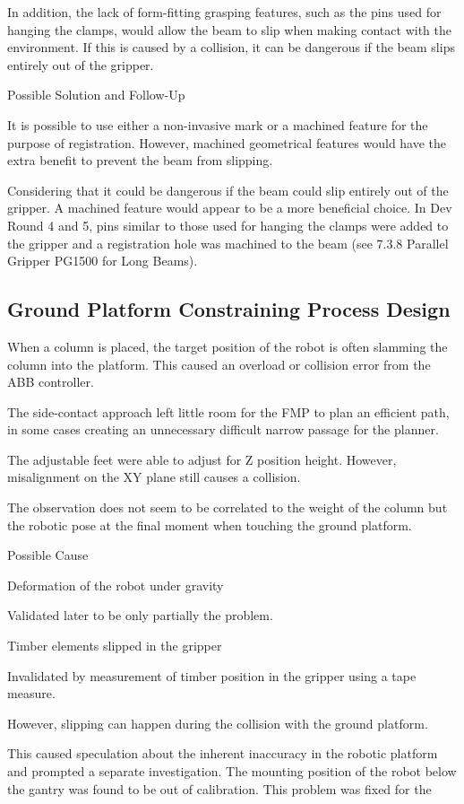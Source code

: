 \begin{itemise}
\begin{itemise}
\begin{itemise}
\begin{itemise}
In addition, the lack of form-fitting grasping features, such as the pins used for hanging the clamps, would allow the beam to slip when making contact with the environment. If this is caused by a collision, it can be dangerous if the beam slips entirely out of the gripper.

Possible Solution and Follow-Up

It is possible to use either a non-invasive mark or a machined feature for the purpose of registration. However, machined geometrical features would have the extra benefit to prevent the beam from slipping. 

Considering that it could be dangerous if the beam could slip entirely out of the gripper. A machined feature would appear to be a more beneficial choice. In Dev Round 4 and 5, pins similar to those used for hanging the clamps were added to the gripper and a registration hole was machined to the beam (see 7.3.8 Parallel Gripper PG1500 for Long Beams).

\subsection{Ground Platform Constraining Process Design}
When a column is placed, the target position of the robot is often slamming the column into the platform. This caused an overload or collision error from the ABB controller.

The side-contact approach left little room for the FMP to plan an efficient path, in some cases creating an unnecessary difficult narrow passage for the planner.


The adjustable feet were able to adjust for Z position height. However, misalignment on the XY plane still causes a collision.

The observation does not seem to be correlated to the weight of the column but the robotic pose at the final moment when touching the ground platform.

Possible Cause
\begin{itemise}
\item Deformation of the robot under gravity
    \begin{itemise}
    \item Validated later to be only partially the problem. 
    \end{itemise}
\item Timber elements slipped in the gripper
    \begin{itemise}
    \item Invalidated by measurement of timber position in the gripper using a tape measure. 
    \item However, slipping can happen during the collision with the ground platform.
    \end{itemise}
\item This caused speculation about the inherent inaccuracy in the robotic platform and prompted a separate investigation. The mounting position of the robot below the gantry was found to be out of calibration. This problem was fixed for the 


\end{itemise}
\end{itemise}
\end{itemise}
\end{itemise}
\end{itemise}

